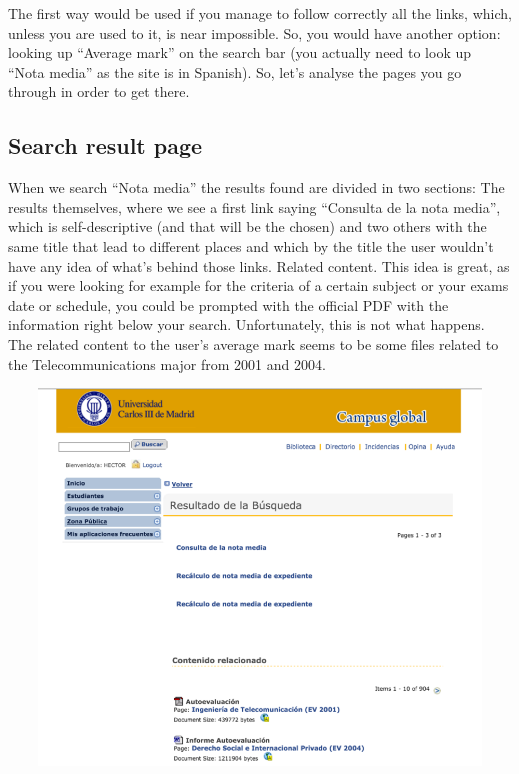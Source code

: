 \documentclass{article}
\begin{document}
The first way would be used if you manage to follow correctly all the links, which, unless you are used to it, is near impossible. So, you would have another option: looking up “Average mark” on the search bar (you actually need to look up “Nota media” as the site is in Spanish). So, let’s analyse the pages you go through in order to get there.
\subsection{Search result page}

When we search “Nota media” the results found are divided in two sections: 
The results themselves, where we see a first link saying “Consulta de la nota media”, which is self-descriptive (and that will be the chosen) and two others with the same title that lead to different places and which by the title the user wouldn’t have any idea of what’s behind those links. 
Related content. This idea is great, as if you were looking for example for the criteria of a certain subject or your exams date or schedule, you could be prompted with the official PDF with the information right below your search. Unfortunately, this is not what happens. The related content to the user’s average mark seems to be some files related to the Telecommunications major from 2001 and 2004. 
\begin{center}
\includegraphics[width=15cm, height=10cm, keepaspectratio]{busqueda}\vspace{0.3cm} \\
\end{center}
\end{document}
